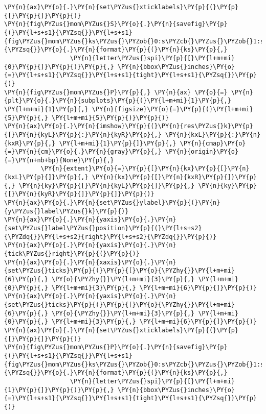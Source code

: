 \begin{Verbatim}[commandchars=\\\{\}]
\PY{n}{ax}\PY{o}{.}\PY{n}{set\PYZus{}xticklabels}\PY{p}{(}\PY{p}{[}\PY{p}{]}\PY{p}{)}
\PY{n}{fig\PYZus{}mom\PYZus{}S}\PY{o}{.}\PY{n}{savefig}\PY{p}{(}\PY{l+s+s1}{\PYZsq{}}\PY{l+s+s1}{fig\PYZus{}mom\PYZus{}ks\PYZus{}\PYZob{}0:s\PYZcb{}\PYZus{}\PYZob{}1:s\PYZcb{}}\PY{l+s+s1}{\PYZsq{}}\PY{o}{.}\PY{n}{format}\PY{p}{(}\PY{n}{ks}\PY{p}{,}
                  \PY{n}{letter\PYZus{}spi}\PY{p}{[}\PY{l+m+mi}{0}\PY{p}{]}\PY{p}{)}\PY{p}{,} \PY{n}{bbox\PYZus{}inches}\PY{o}{=}\PY{l+s+s1}{\PYZsq{}}\PY{l+s+s1}{tight}\PY{l+s+s1}{\PYZsq{}}\PY{p}{)}
\PY{n}{fig\PYZus{}mom\PYZus{}P}\PY{p}{,} \PY{n}{ax} \PY{o}{=} \PY{n}{plt}\PY{o}{.}\PY{n}{subplots}\PY{p}{(}\PY{l+m+mi}{1}\PY{p}{,} \PY{l+m+mi}{1}\PY{p}{,} \PY{n}{figsize}\PY{o}{=}\PY{p}{(}\PY{l+m+mi}{5}\PY{p}{,} \PY{l+m+mi}{5}\PY{p}{)}\PY{p}{)}
\PY{n}{ax}\PY{o}{.}\PY{n}{imshow}\PY{p}{(}\PY{n}{res\PYZus{}k}\PY{p}{[}\PY{n}{kyL}\PY{p}{:}\PY{n}{kyR}\PY{p}{,} \PY{n}{kxL}\PY{p}{:}\PY{n}{kxR}\PY{p}{,} \PY{l+m+mi}{1}\PY{p}{]}\PY{p}{,} \PY{n}{cmap}\PY{o}{=}\PY{n}{cm}\PY{o}{.}\PY{n}{gray}\PY{p}{,} \PY{n}{origin}\PY{o}{=}\PY{n+nb+bp}{None}\PY{p}{,}
          \PY{n}{extent}\PY{o}{=}\PY{p}{[}\PY{n}{kx}\PY{p}{[}\PY{n}{kxL}\PY{p}{]}\PY{p}{,} \PY{n}{kx}\PY{p}{[}\PY{n}{kxR}\PY{p}{]}\PY{p}{,} \PY{n}{ky}\PY{p}{[}\PY{n}{kyL}\PY{p}{]}\PY{p}{,} \PY{n}{ky}\PY{p}{[}\PY{n}{kyR}\PY{p}{]}\PY{p}{]}\PY{p}{)}
\PY{n}{ax}\PY{o}{.}\PY{n}{set\PYZus{}ylabel}\PY{p}{(}\PY{n}{y\PYZus{}label\PYZus{}k}\PY{p}{)}
\PY{n}{ax}\PY{o}{.}\PY{n}{yaxis}\PY{o}{.}\PY{n}{set\PYZus{}label\PYZus{}position}\PY{p}{(}\PY{l+s+s2}{\PYZdq{}}\PY{l+s+s2}{right}\PY{l+s+s2}{\PYZdq{}}\PY{p}{)}
\PY{n}{ax}\PY{o}{.}\PY{n}{yaxis}\PY{o}{.}\PY{n}{tick\PYZus{}right}\PY{p}{(}\PY{p}{)}
\PY{n}{ax}\PY{o}{.}\PY{n}{xaxis}\PY{o}{.}\PY{n}{set\PYZus{}ticks}\PY{p}{(}\PY{p}{[}\PY{o}{\PYZhy{}}\PY{l+m+mi}{6}\PY{p}{,} \PY{o}{\PYZhy{}}\PY{l+m+mi}{3}\PY{p}{,} \PY{l+m+mi}{0}\PY{p}{,} \PY{l+m+mi}{3}\PY{p}{,} \PY{l+m+mi}{6}\PY{p}{]}\PY{p}{)}
\PY{n}{ax}\PY{o}{.}\PY{n}{yaxis}\PY{o}{.}\PY{n}{set\PYZus{}ticks}\PY{p}{(}\PY{p}{[}\PY{o}{\PYZhy{}}\PY{l+m+mi}{6}\PY{p}{,} \PY{o}{\PYZhy{}}\PY{l+m+mi}{3}\PY{p}{,} \PY{l+m+mi}{0}\PY{p}{,} \PY{l+m+mi}{3}\PY{p}{,} \PY{l+m+mi}{6}\PY{p}{]}\PY{p}{)}
\PY{n}{ax}\PY{o}{.}\PY{n}{set\PYZus{}xticklabels}\PY{p}{(}\PY{p}{[}\PY{p}{]}\PY{p}{)}
\PY{n}{fig\PYZus{}mom\PYZus{}P}\PY{o}{.}\PY{n}{savefig}\PY{p}{(}\PY{l+s+s1}{\PYZsq{}}\PY{l+s+s1}{fig\PYZus{}mom\PYZus{}ks\PYZus{}\PYZob{}0:s\PYZcb{}\PYZus{}\PYZob{}1:s\PYZcb{}}\PY{l+s+s1}{\PYZsq{}}\PY{o}{.}\PY{n}{format}\PY{p}{(}\PY{n}{ks}\PY{p}{,}
                  \PY{n}{letter\PYZus{}spi}\PY{p}{[}\PY{l+m+mi}{1}\PY{p}{]}\PY{p}{)}\PY{p}{,} \PY{n}{bbox\PYZus{}inches}\PY{o}{=}\PY{l+s+s1}{\PYZsq{}}\PY{l+s+s1}{tight}\PY{l+s+s1}{\PYZsq{}}\PY{p}{)}

\end{Verbatim}
